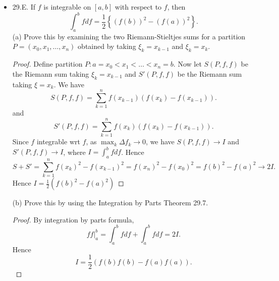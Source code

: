 
\begin{itemize}
	\item 29.E. If $f$ is integrable on $[a, b]$ with respect to $f$, then
\[
\int_a^b f d f=\frac{1}{2}\left\{(f(b))^2-(f(a))^2\right\} .
\]
(a) Prove this by examining the two Riemann-Stieltjes sums for a partition $P=\left(x_0, x_1, \ldots, x_n\right)$ obtained by taking $\xi_k=x_{k-1}$ and $\xi_k=x_k$.
\begin{proof}
	Define partition $P: a = x_0 < x_1 < \ldots < x_n = b$. Now let $S(P, f, f)$ be the Riemann sum taking $\xi_k = x_{k-1}$  and $S'(P, f, f)$ be the Riemann sum taking $\xi = x_k$. We have
	\[
		S(P, f, f) = \sum_{k=1}^{n} f(x_{k-1})\left( f(x_k) - f(x_{k-1}) \right) 
	.\] 
	and
	\[
		S'(P, f, f) = \sum_{k=1}^{n} f(x_k)\left( f(x_k) - f(x_{k-1 }) \right) 
	.\] 
	Since $f$ integrable wrt $f$, as  $\max_k \Delta f_k \to 0$, we have $S(P, f, f) \to I$ and $S'(P, f, f) \to I$, where $I = \int _a^b f df$. Hence
	\[
		S + S' = \sum_{k=1}^{n} f(x_k)^2 - f(x_{k-1 })^2 = f(x_n)^2 - f(x_0)^2 = f(b)^2 - f(a)^2 \to 2I
	.\] 
	Hence $I = \frac{1}{2}\left( f(b)^2 - f(a)^2 \right) $
\end{proof}

(b) Prove this by using the Integration by Parts Theorem 29.7.
\begin{proof}
	By integration by parts formula,
	\[
		ff|_a^b = \int_a^b f df + \int _a^b f df =2 I 
	.\] 
	Hence
	\[
		I = \frac{1}{2} \left( f(b)f(b) - f(a)f(a) \right) 
	.\] 
\end{proof}


\end{itemize}
